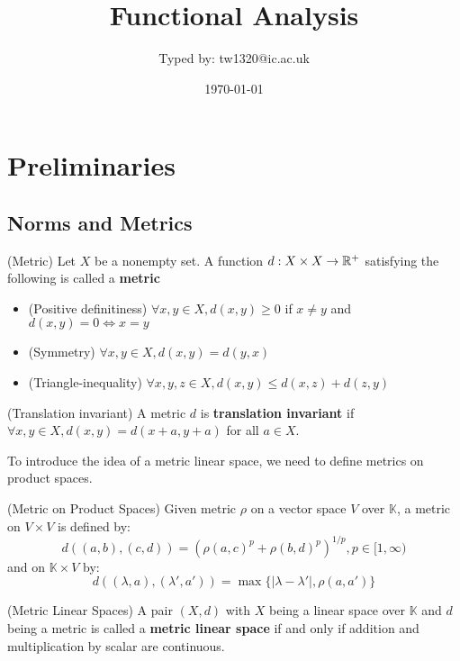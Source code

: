 \documentclass{article}
\title{Functional Analysis}
\author{Typed by: tw1320@ic.ac.uk}
\date{\today}
\begin{document}
\maketitle

\section{Preliminaries}   

\subsection{Norms and Metrics}

\begin{defn}
(Metric) Let $X$ be a nonempty set. 
A function $d: X \times X \to \mathbb{R}^+$ satisfying the following is called a  \textbf{metric}  

\begin{itemize}
    \item (Positive definitiness) $\forall x,y \in X, d(x,y)\geq 0$ if $x \neq y$ and $d(x,y)=0 \iff x=y$
    \item (Symmetry) $\forall x,y \in X, d(x,y)=d(y,x)$
    \item (Triangle-inequality) $\forall x,y,z \in X, d(x,y) \leq d(x,z) + d(z,y)$
\end{itemize}

\end{defn}
\begin{defn}
    (Translation invariant) A metric $d$ is \textbf{translation invariant} if $\forall x,y \in X, d(x,y)=d(x+a,y+a)$ for all $a \in X$.
\end{defn} 

To introduce the idea of a metric linear space, we need to define metrics on product spaces.  

\begin{defn} (Metric on Product Spaces)
    Given metric $\rho$ on a vector space $V$ over $\mathbb{K}$, a metric on $V \times V$ is defined by:  
    \begin{equation*}
        d((a,b),(c,d)) = (\rho(a,c)^p+\rho(b,d)^p)^{1/p}, p \in [1,\infty)
    \end{equation*}  
    and on $\mathbb{K} \times V$ by:
    \begin{equation*}
        d((\lambda, a),(\lambda',a')) = \max \{|\lambda-\lambda'|, \rho (a, a')\}
    \end{equation*}
\end{defn}

\begin{defn}
    (Metric Linear Spaces) 
    A pair $(X, d)$ with $X$ being a linear space over $\mathbb{K}$ and $d$ being a metric is called a \textbf{metric linear space} if and only if
    addition and multiplication by scalar are continuous.
\end{defn}   
\end{document}
